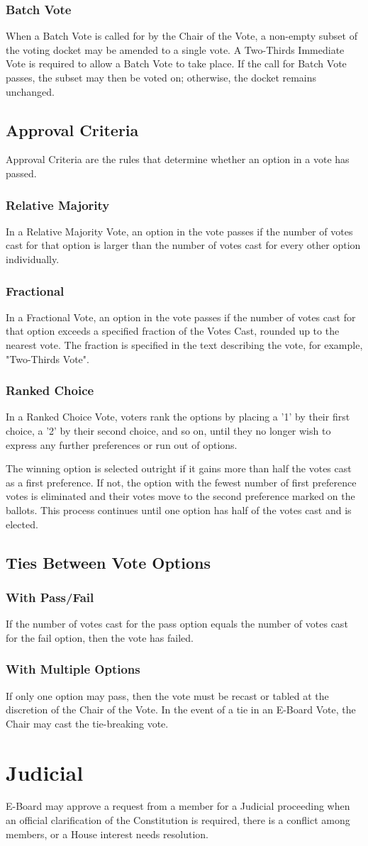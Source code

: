 \documentclass{article}
\newcommand{\article}[1]{\section{#1} \label{#1}}
\newcommand{\asection}[1]{\subsection{#1} \label{#1}}
\newcommand{\asubsection}[1]{\subsubsection{#1} \label{#1}}
\begin{document}
\asubsection{Batch Vote}
When a Batch Vote is called for by the Chair of the Vote, a non-empty subset of the voting docket may be amended to a single vote.
A Two-Thirds Immediate Vote is required to allow a Batch Vote to take place.
If the call for Batch Vote passes, the subset may then be voted on; otherwise, the docket remains unchanged.

\asection{Approval Criteria}
Approval Criteria are the rules that determine whether an option in a vote has passed.

\asubsection{Relative Majority}
In a Relative Majority Vote, an option in the vote passes if the number of votes cast for that option is larger than the number of votes cast for every other option individually.

\asubsection{Fractional}
In a Fractional Vote, an option in the vote passes if the number of votes cast for that option exceeds a specified fraction of the Votes Cast, rounded up to the nearest vote.
The fraction is specified in the text describing the vote, for example, "Two-Thirds Vote".

\asubsection{Ranked Choice}
In a Ranked Choice Vote, voters rank the options by placing a '1' by their first choice, a '2' by their second choice, and so on, until they no longer wish to express any further preferences or run out of options.

The winning option is selected outright if it gains more than half the votes cast as a first preference.
If not, the option with the fewest number of first preference votes is eliminated and their votes move to the second preference marked on the ballots.
This process continues until one option has half of the votes cast and is elected.

\asection{Ties Between Vote Options}

\asubsection{With Pass/Fail}
If the number of votes cast for the pass option equals the number of votes cast for the fail option, then the vote has failed.

\asubsection{With Multiple Options}
If only one option may pass, then the vote must be recast or tabled at the discretion of the Chair of the Vote.
In the event of a tie in an E-Board Vote, the Chair may cast the tie-breaking vote.

\article{Judicial}
E-Board may approve a request from a member for a Judicial proceeding when an official clarification of the Constitution is required, there is a conflict among members, or a House interest needs resolution.
\end{document}
